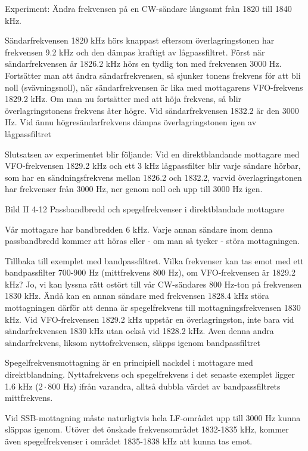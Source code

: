 Experiment: Ändra frekvensen på en CW-sändare långsamt från 1820 till
1840 kHz.

Sändarfrekvensen 1820 kHz hörs knappast eftersom överlagringstonen har
frekvensen 9.2 kHz och den dämpas kraftigt av lågpassfiltret. Först
när sändarfrekvensen är 1826.2 kHz hörs en tydlig ton med frekvensen
3000 Hz. Fortsätter man att ändra sändarfrekvensen, så sjunker tonens
frekvens för att bli noll (svävningsnoll), när sändarfrekvensen är
lika med mottagarens VFO-frekvens 1829.2 kHz. Om man nu fortsätter med
att höja frekvens, så blir överlagringstonens frekvens åter högre. Vid
sändarfrekvensen 1832.2 är den 3000 Hz. Vid ännu högresändarfrekvens
dämpas överlagringstonen igen av lågpassfiltret

Slutsatsen av experimentet blir följande: Vid en direktblandande
mottagare med VFO-frekvensen 1829.2 kHz och ett 3 kHz lågpassfilter
blir varje sändare hörbar, som har en sändningsfrekvens mellan 1826.2
och 1832.2, varvid överlagringstonen har frekvenser från 3000 Hz, ner
genom noll och upp till 3000 Hz igen.

Bild II 4-12 Passbandbredd och spegelfrekvenser i direktblandade mottagare

Vår mottagare har bandbredden 6 kHz.  Varje annan sändare inom denna
passbandbredd kommer att höras eller - om man så tycker - störa
mottagningen.

Tillbaka till exemplet med bandpassfiltret. Vilka frekvenser kan tas
emot med ett bandpassfilter 700-900 Hz (mittfrekvens 800 Hz), om
VFO-frekvensen är 1829.2 kHz?  Jo, vi kan lyssna rätt ostört till vår
CW-sändares 800 Hz-ton på frekvensen 1830 kHz. Ändå kan en annan
sändare med frekvensen 1828.4 kHz störa mottagningen därför att denna
är spegelfrekvens till mottagningsfrekvensen 1830 kHz. Vid
VFO-frekvensen 1829.2 kHz uppstår en överlagringston, inte bara vid
sändarfrekvensen 1830 kHz utan också vid 1828.2 kHz. Aven denna andra
sändarfrekvens, liksom nyttofrekvensen, släpps igenom bandpassfiltret

Spegelfrekvensmottagning är en principiell nackdel i mottagare med
direktblandning. Nyttafrekvens och spegelfrekvens i det senaste
exemplet ligger 1.6 kHz (\(2 \cdot 800\) Hz) ifrån varandra, alltså
dubbla värdet av bandpassfiltrets mittfrekvens.

Vid SSB-mottagning måste naturligtvis hela LF-området upp till 3000 Hz
kunna släppas igenom. Utöver det önskade frekvensområdet 1832-1835
kHz, kommer även spegelfrekvenser i området 1835-1838 kHz att kunna
tas emot.

